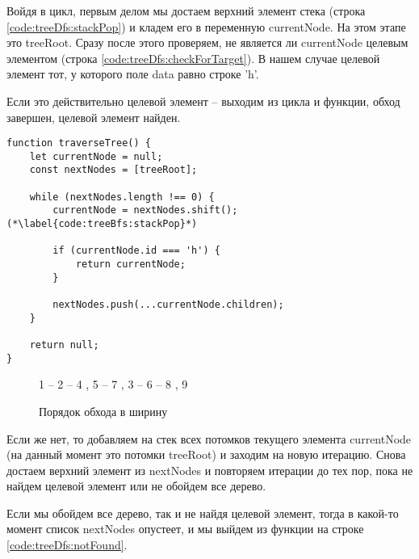 \documentclass[../../article]{subfiles}
\begin{document}
Войдя в цикл, первым делом мы достаем верхний элемент стека (строка \ref{code:treeDfs:stackPop}) и кладем его в переменную {\firacodebold currentNode}. На этом этапе это {\firacodebold treeRoot}. Сразу после этого проверяем, не является ли {\firacodebold currentNode} целевым элементом (строка \ref{code:treeDfs:checkForTarget}). В нашем случае целевой элемент тот, у которого поле {\firacodebold data} равно строке {\firacodebold 'h'}.

Если это действительно целевой элемент – выходим из цикла и функции, обход завершен, целевой элемент найден.

\begin{figure*}
    \begin{ruledelement}
        \begin{lstlisting}[caption={Обход дерева в ширину}, label={lst:treeBfs}]
function traverseTree() {
    let currentNode = null;
    const nextNodes = [treeRoot];

    while (nextNodes.length !== 0) {
        currentNode = nextNodes.shift(); (*\label{code:treeBfs:stackPop}*)

        if (currentNode.id === 'h') {
            return currentNode;
        }

        nextNodes.push(...currentNode.children);
    }

    return null;
}

        \end{lstlisting}
    \end{ruledelement}
\end{figure*}

\begin{figure}
    \styledgraph
    {
        1 -- { 2 -- { 4 , 5 -- 7 }, 3 -- 6 -- { 8 , 9 }}
    }
    \caption{Порядок обхода в ширину}
    \label{fig:treeBfsOrder}
\end{figure}

Если же нет, то добавляем на стек всех потомков текущего элемента {\firacodebold currentNode} (на данный момент это потомки {\firacodebold treeRoot}) и заходим на новую итерацию. Снова достаем верхний элемент из {\firacodebold nextNodes} и повторяем итерации до тех пор, пока не найдем целевой элемент или не обойдем все дерево.

Если мы обойдем все дерево, так и не найдя целевой элемент, тогда в какой-то момент список {\firacodebold nextNodes} опустеет, и мы выйдем из функции на строке \ref{code:treeDfs:notFound}.
\end{document}
